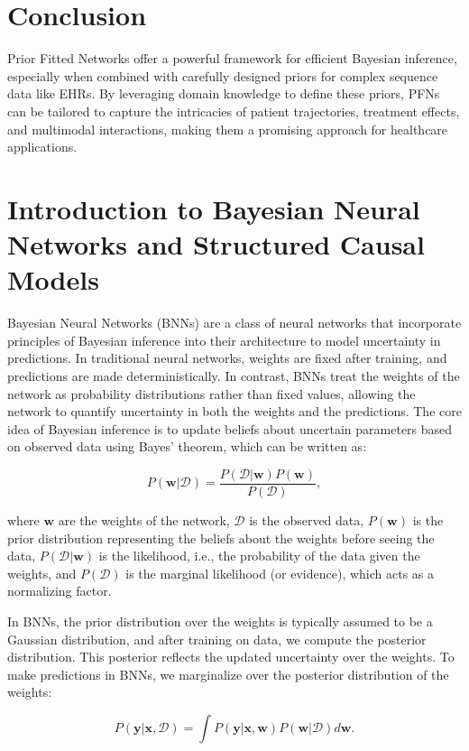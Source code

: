 \documentclass{article}
\begin{document}
\section{Conclusion}

Prior Fitted Networks offer a powerful framework for efficient Bayesian inference, especially when combined with carefully designed priors for complex sequence data like EHRs. By leveraging domain knowledge to define these priors, PFNs can be tailored to capture the intricacies of patient trajectories, treatment effects, and multimodal interactions, making them a promising approach for healthcare applications.


\section{Introduction to Bayesian Neural Networks and Structured Causal Models}

Bayesian Neural Networks (BNNs) are a class of neural networks that incorporate principles of Bayesian inference into their architecture to model uncertainty in predictions. In traditional neural networks, weights are fixed after training, and predictions are made deterministically. In contrast, BNNs treat the weights of the network as probability distributions rather than fixed values, allowing the network to quantify uncertainty in both the weights and the predictions. The core idea of Bayesian inference is to update beliefs about uncertain parameters based on observed data using Bayes' theorem, which can be written as:

\[
P(\mathbf{w} | \mathcal{D}) = \frac{P(\mathcal{D} | \mathbf{w}) P(\mathbf{w})}{P(\mathcal{D})},
\]

where $\mathbf{w}$ are the weights of the network, $\mathcal{D}$ is the observed data, $P(\mathbf{w})$ is the prior distribution representing the beliefs about the weights before seeing the data, $P(\mathcal{D} | \mathbf{w})$ is the likelihood, i.e., the probability of the data given the weights, and $P(\mathcal{D})$ is the marginal likelihood (or evidence), which acts as a normalizing factor.

In BNNs, the prior distribution over the weights is typically assumed to be a Gaussian distribution, and after training on data, we compute the posterior distribution. This posterior reflects the updated uncertainty over the weights. To make predictions in BNNs, we marginalize over the posterior distribution of the weights:

\[
P(\mathbf{y} | \mathbf{x}, \mathcal{D}) = \int P(\mathbf{y} | \mathbf{x}, \mathbf{w}) P(\mathbf{w} | \mathcal{D}) d\mathbf{w}.
\]
\end{document}
